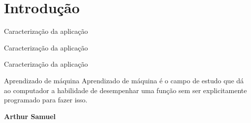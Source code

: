 \section{Introdução}
\begin{frame}{Caracterização da aplicação}

\end{frame}

\begin{frame}{Caracterização da aplicação}
\end{frame}

\begin{frame}{Caracterização da aplicação}
\end{frame}

\begin{frame}{Aprendizado de máquina}
	Aprendizado de máquina é o campo de estudo que dá ao computador a habilidade de desempenhar uma função sem ser explicitamente programado para fazer isso.

	\textbf{Arthur Samuel}
\end{frame}

